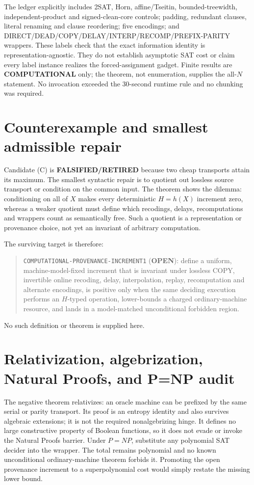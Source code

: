 \documentclass[11pt]{article}
\newcommand{\COMP}{\textbf{COMPUTATIONAL}}
\newcommand{\OPEN}{\textbf{OPEN}}
\newcommand{\RETIRED}{\textbf{FALSIFIED/RETIRED}}
\newcommand{\claim}[1]{\texttt{#1}}
\begin{document}
The ledger explicitly includes 2SAT, Horn, affine/Tseitin, bounded-treewidth,
independent-product and signed-clean-core controls; padding, redundant
clauses, literal renaming and clause reordering; five encodings; and
DIRECT/DEAD/COPY/DELAY/INTERP/RECOMP/PREFIX-PARITY wrappers.  These labels
check that the exact information identity is representation-agnostic.  They
do not establish asymptotic SAT cost or claim every label instance realizes
the forced-assignment gadget.  Finite results are \COMP{} only; the theorem,
not enumeration, supplies the all-$N$ statement.  No invocation exceeded the
30-second runtime rule and no chunking was required.

\section{Counterexample and smallest admissible repair}
Candidate (C) is \RETIRED{} because two cheap transports attain its maximum.
The smallest syntactic repair is to quotient out lossless source transport or
condition on the common input.  The theorem shows the dilemma: conditioning
on all of $X$ makes every deterministic $H=h(X)$ increment zero, whereas a
weaker quotient must define which recodings, delays, recomputations and
wrappers count as semantically free.  Such a quotient is a representation or
provenance choice, not yet an invariant of arbitrary computation.

The surviving target is therefore:
\begin{quote}
\claim{COMPUTATIONAL-PROVENANCE-INCREMENT1} (\OPEN): define a uniform,
machine-model-fixed increment that is invariant under lossless COPY, invertible
online recoding, delay, interpolation, replay, recomputation and alternate
encodings, is positive only when the same deciding execution performs an
$H$-typed operation, lower-bounds a charged ordinary-machine resource, and
lands in a model-matched unconditional forbidden region.
\end{quote}
No such definition or theorem is supplied here.

\section{Relativization, algebrization, Natural Proofs, and P=NP audit}
The negative theorem relativizes: an oracle machine can be prefixed by the
same serial or parity transport.  Its proof is an entropy identity and also
survives algebraic extensions; it is not the required nonalgebrizing hinge.
It defines no large constructive property of Boolean functions, so it does
not evade or invoke the Natural Proofs barrier.  Under $P=NP$, substitute any
polynomial SAT decider into the wrapper.  The total remains polynomial and no
known unconditional ordinary-machine theorem forbids it.  Promoting the open
provenance increment to a superpolynomial cost would simply restate the
missing lower bound.
\end{document}
